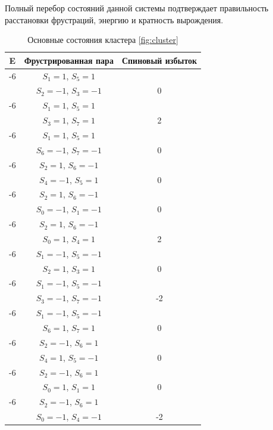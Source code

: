 \documentclass[utf8, babel, sor, jor, amsmath, amssymb, reprint]{elsarticle} %
\begin{document}
Полный перебор состояний данной системы подтверждает правильность расстановки фрустраций, энергию и кратность вырождения.

\begin{table}[h]
	\centering
	\begin{tabular}{|c|c|c|}
		\hline
		E   &   Фрустрированная пара & Спиновый избыток\\
		\hline
		-6   &  $S_1=1$, $S_5=1$ & \\
		      &    $S_2=-1$, $S_3=-1$ &0 \\
		 \hline
		 -6   &  $S_1=1$, $S_5=1$ &\\
		      &    $S_3=1$, $S_7=1$ & 2\\
		 \hline
		 -6   &  $S_1=1$, $S_5=1$ & \\
		      &    $S_6=-1$, $S_7=-1$ & 0\\
		 \hline
		-6   &  $S_2=1$, $S_6=-1$ & \\
				&    $S_4=-1$, $S_5=1$ & 0\\
		 \hline
		-6   &  $S_2=1$, $S_6=-1$ &\\
				&    $S_0=-1$, $S_1=-1$ & 0\\
		 \hline
		-6   &  $S_2=1$, $S_6=-1$ &\\
				&    $S_0=1$, $S_4=1$ & 2\\
		\hline
		-6   &  $S_1=-1$, $S_5=-1$ &\\
			&    $S_2=1$, $S_3=1$ & 0\\
		\hline
		-6   &  $S_1=-1$, $S_5=-1$ &\\
			&    $S_3=-1$, $S_7=-1$ & -2\\
		\hline
		-6   &  $S_1=-1$, $S_5=-1$ &\\
			&    $S_6=1$, $S_7=1$ & 0\\
		\hline
		-6   &  $S_2=-1$, $S_6=1$ &\\
			&    $S_4=1$, $S_5=-1$ & 0\\
		\hline
		-6   &  $S_2=-1$, $S_6=1$ &\\
			&    $S_0=1$, $S_1=1$ & 0\\
		\hline
		-6   &  $S_2=-1$, $S_6=1$ &\\
			&    $S_0=-1$, $S_4=-1$ & -2\\
		\hline
	\end{tabular}
	\caption{Основные состояния кластера \eqref{fig:cluster}}
	\label{tab:gs_cl}
\end{table}
\end{document}
